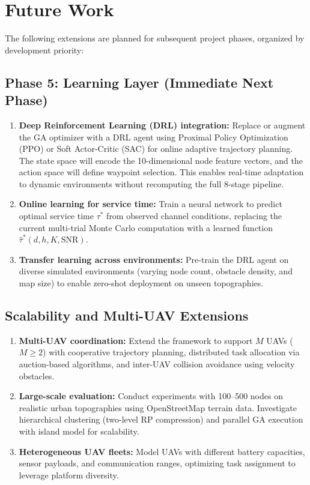 \documentclass[12pt, a4paper, oneside]{report}
\begin{document}
\section{Future Work}

The following extensions are planned for subsequent project phases, organized by development priority:

\subsection{Phase 5: Learning Layer (Immediate Next Phase)}

\begin{enumerate}
    \item \textbf{Deep Reinforcement Learning (DRL) integration:} Replace or augment the GA optimizer with a DRL agent using Proximal Policy Optimization (PPO) or Soft Actor-Critic (SAC) for online adaptive trajectory planning. The state space will encode the 10-dimensional node feature vectors, and the action space will define waypoint selection. This enables real-time adaptation to dynamic environments without recomputing the full 8-stage pipeline.

    \item \textbf{Online learning for service time:} Train a neural network to predict optimal service time $\tau^*$ from observed channel conditions, replacing the current multi-trial Monte Carlo computation with a learned function $\hat{\tau}^*(d, h, K, \text{SNR})$.

    \item \textbf{Transfer learning across environments:} Pre-train the DRL agent on diverse simulated environments (varying node count, obstacle density, and map size) to enable zero-shot deployment on unseen topographies.
\end{enumerate}

\subsection{Scalability and Multi-UAV Extensions}

\begin{enumerate}
    \item \textbf{Multi-UAV coordination:} Extend the framework to support $M$ UAVs ($M \geq 2$) with cooperative trajectory planning, distributed task allocation via auction-based algorithms, and inter-UAV collision avoidance using velocity obstacles.

    \item \textbf{Large-scale evaluation:} Conduct experiments with 100--500 nodes on realistic urban topographies using OpenStreetMap terrain data. Investigate hierarchical clustering (two-level RP compression) and parallel GA execution with island model for scalability.

    \item \textbf{Heterogeneous UAV fleets:} Model UAVs with different battery capacities, sensor payloads, and communication ranges, optimizing task assignment to leverage platform diversity.
\end{enumerate}
\end{document}
